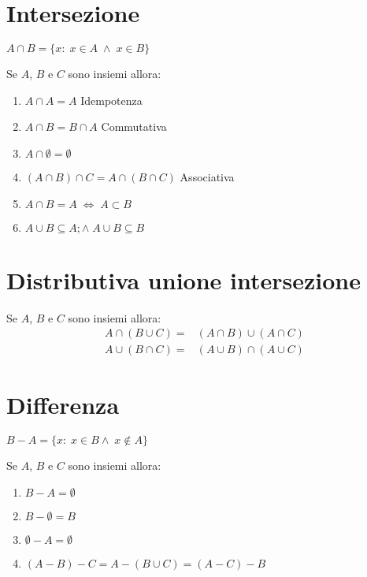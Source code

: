 \section{Intersezione}
\begin{defn}[Intersezione]
$A\cap B=\lbrace x:\;x\in A\;\wedge\; x\in B\rbrace$
\end{defn}
{\centering
	
	\par
}
\begin{thm}
	Se $A$, $B$ e $C$ sono insiemi allora:
	\begin{enumerate}
		\item $A\cap A=A$ Idempotenza
		\item $A\cap B=B\cap A$ Commutativa
		\item $A\cap\emptyset=\emptyset$
		\item $\left(A\cap B\right)\cap C=A\cap\left(B\cap C\right)$ Associativa
		\item $A\cap B=A\;\Leftrightarrow\; A\subset B$
		\item $A\cup B\subseteq A;\wedge\;A\cup B\subseteq B$ 
	\end{enumerate}
\end{thm}
\section{Distributiva unione intersezione}
\begin{thm}[Distributiva]
	Se $A$, $B$ e $C$ sono insiemi allora:
	\begin{align*}
A\cap\left(B\cup C\right)=&\left(A\cap B\right)\cup\left(A\cap C\right)\\
A\cup\left(B\cap C\right)=&\left(A\cup B\right)\cap\left(A\cup C\right)
	\end{align*}
\end{thm}
	\section{Differenza}
	\begin{defn}[Differenza]
	$B-A=\lbrace x:\; x\in B\wedge\; x\notin A\rbrace$
	\end{defn}
{\centering
	
\par}
\begin{thm}
Se $A$, $B$ e $C$ sono insiemi allora:
\begin{enumerate}
	\item $B-A=\emptyset$
	\item $B-\emptyset=B$
	\item $\emptyset-A=\emptyset$
	\item $\left(A-B\right)-C=A-\left(B\cup C\right)=\left(A-C\right)-B$
\end{enumerate}
\end{thm}
